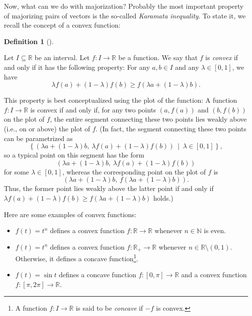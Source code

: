 \documentclass[numbers=enddot,12pt,final,onecolumn,notitlepage]{scrartcl}%
\numberwithin{exer}{subsection}
\theoremstyle{definition}
\newtheorem{defi}[theo]{Definition}
\newenvironment{definition}[1][]
{\begin{defi}[#1]\begin{leftbar}}
{\end{leftbar}\end{defi}}
\begin{document}
Now, what can we do with majorization? Probably the most important property of
majorizing pairs of vectors is the so-called \emph{Karamata inequality}. To
state it, we recall the concept of a convex function:

\begin{definition}
\label{def.major.convex}Let $I\subseteq\mathbb{R}$ be an interval. Let
$f:I\rightarrow\mathbb{R}$ be a function. We say that $f$ is \emph{convex} if
and only if it has the following property: For any $a,b\in I$ and any
$\lambda\in\left[  0,1\right]  $, we have%
\[
\lambda f\left(  a\right)  +\left(  1-\lambda\right)  f\left(  b\right)  \geq
f\left(  \lambda a+\left(  1-\lambda\right)  b\right)  .
\]

\end{definition}

This property is best conceptualized using the plot of the function: A
function $f:I\rightarrow\mathbb{R}$ is convex if and only if, for any two
points $\left(  a,f\left(  a\right)  \right)  $ and $\left(  b,f\left(
b\right)  \right)  $ on the plot of $f$, the entire segment connecting these
two points lies weakly above (i.e., on or above) the plot of $f$. (In fact,
the segment connecting these two points can be parametrized as
\[
\left\{  \left(  \lambda a+\left(  1-\lambda\right)  b,\ \lambda f\left(
a\right)  +\left(  1-\lambda\right)  f\left(  b\right)  \right)
\ \mid\ \lambda\in\left[  0,1\right]  \right\}  ,
\]
so a typical point on this segment has the form
\[
\left(  \lambda a+\left(  1-\lambda\right)  b,\ \lambda f\left(  a\right)
+\left(  1-\lambda\right)  f\left(  b\right)  \right)
\]
for some $\lambda\in\left[  0,1\right]  $, whereas the corresponding point on
the plot of $f$ is
\[
\left(  \lambda a+\left(  1-\lambda\right)  b,\ f\left(  \lambda a+\left(
1-\lambda\right)  b\right)  \right)  .
\]
Thus, the former point lies weakly above the latter point if and only if
$\lambda f\left(  a\right)  +\left(  1-\lambda\right)  f\left(  b\right)  \geq
f\left(  \lambda a+\left(  1-\lambda\right)  b\right)  $ holds.)

Here are some examples of convex functions:

\begin{itemize}
\item $f\left(  t\right)  =t^{n}$ defines a convex function $f:\mathbb{R}%
\rightarrow\mathbb{R}$ whenever $n\in\mathbb{N}$ is even.

\item $f\left(  t\right)  =t^{n}$ defines a convex function $f:\mathbb{R}%
_{+}\rightarrow\mathbb{R}$ whenever $n\in\mathbb{R}\setminus\left(
0,1\right)  $. Otherwise, it defines a concave function\footnote{A function
$f:I\rightarrow\mathbb{R}$ is said to be \emph{concave} if $-f$ is convex.}.

\item $f\left(  t\right)  =\sin t$ defines a concave function $f:\left[
0,\pi\right]  \rightarrow\mathbb{R}$ and a convex function $f:\left[  \pi
,2\pi\right]  \rightarrow\mathbb{R}$.
\end{itemize}
\end{document}
